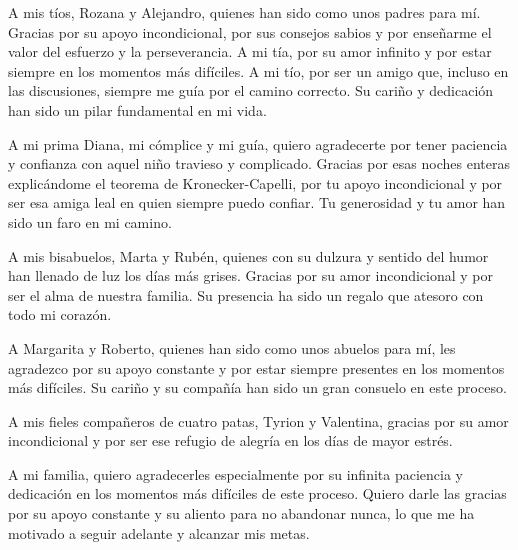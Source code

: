\begin{acknowledgements}
    \vspace{1em}

    \noindent
    
    A mis tíos, Rozana y Alejandro, quienes han sido como unos padres para mí. Gracias por su apoyo incondicional, por sus consejos sabios y por enseñarme el valor del esfuerzo y la perseverancia. A mi tía, por su amor infinito y por estar siempre en los momentos más difíciles. A mi tío, por ser un amigo que, incluso en las discusiones, siempre me guía por el camino correcto. Su cariño y dedicación han sido un pilar fundamental en mi vida.
    
    \vspace{1em}

    \noindent
    A mi prima Diana, mi cómplice y mi guía, quiero agradecerte por tener paciencia y confianza con aquel niño travieso y complicado. Gracias por esas noches enteras explicándome el teorema de Kronecker-Capelli, por tu apoyo incondicional y por ser esa amiga leal en quien siempre puedo confiar. Tu generosidad y tu amor han sido un faro en mi camino.

    \vspace{1em}
    
    \noindent

    A mis bisabuelos, Marta y Rubén, quienes con su dulzura y sentido del humor han llenado de luz los días más grises. Gracias por su amor incondicional y por ser el alma de nuestra familia. Su presencia ha sido un regalo que atesoro con todo mi corazón.

    \vspace{1em}

    \noindent
    A Margarita y Roberto, quienes han sido como unos abuelos para mí, les agradezco por su apoyo constante y por estar siempre presentes en los momentos más difíciles. Su cariño y su compañía han sido un gran consuelo en este proceso.

    \vspace{1em}

    \noindent

    A mis fieles compañeros de cuatro patas, Tyrion y Valentina, gracias por su amor incondicional y por ser ese refugio de alegría en los días de mayor estrés.

    \vspace{1em}

    \noindent
    A mi familia, quiero agradecerles especialmente por su infinita paciencia y dedicación en los momentos más difíciles de este proceso. Quiero darle las gracias por su apoyo constante y su aliento para no abandonar nunca, lo que me ha motivado a seguir adelante y alcanzar mis metas.
    \vspace{1em}


\end{acknowledgements}
